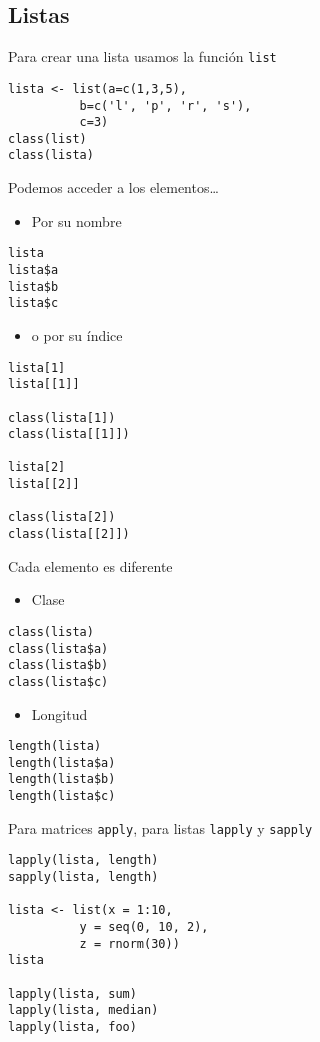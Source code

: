 \documentclass[xcolor={usenames,svgnames,dvipsnames}]{beamer}
\begin{document}
\subsection{Listas}
\label{sec-4-1}
\begin{frame}[fragile,label=sec-4-1-1]{Para crear una lista usamos la función \texttt{list}}
 \lstset{language=R,numbers=none}
\begin{lstlisting}
lista <- list(a=c(1,3,5),
	      b=c('l', 'p', 'r', 's'),
	      c=3)
class(list)
class(lista)
\end{lstlisting}
\end{frame}
\begin{frame}[fragile,label=sec-4-1-2]{Podemos acceder a los elementos\ldots{}}
 \begin{itemize}
\item Por su nombre
\end{itemize}
\lstset{language=R,numbers=none}
\begin{lstlisting}
lista
lista$a
lista$b
lista$c
\end{lstlisting}

\begin{itemize}
\item o por su índice
\end{itemize}
\lstset{language=R,numbers=none}
\begin{lstlisting}
lista[1]
lista[[1]]

class(lista[1])
class(lista[[1]])

lista[2]
lista[[2]]

class(lista[2])
class(lista[[2]])
\end{lstlisting}
\end{frame}
\begin{frame}[fragile,label=sec-4-1-3]{Cada elemento es diferente}
 \begin{itemize}
\item Clase
\end{itemize}
\lstset{language=R,numbers=none}
\begin{lstlisting}
class(lista)
class(lista$a)
class(lista$b)
class(lista$c)
\end{lstlisting}
\begin{itemize}
\item Longitud
\end{itemize}
\lstset{language=R,numbers=none}
\begin{lstlisting}
length(lista)
length(lista$a)
length(lista$b)
length(lista$c)
\end{lstlisting}
\end{frame}
\begin{frame}[fragile,label=sec-4-1-4]{Para matrices \texttt{apply}, para listas \texttt{lapply} y \texttt{sapply}}
 \lstset{language=R,numbers=none}
\begin{lstlisting}
lapply(lista, length)
sapply(lista, length)

lista <- list(x = 1:10,
	      y = seq(0, 10, 2),
	      z = rnorm(30))
lista

lapply(lista, sum)
lapply(lista, median)
lapply(lista, foo)
\end{lstlisting}
\end{frame}
\end{document}
